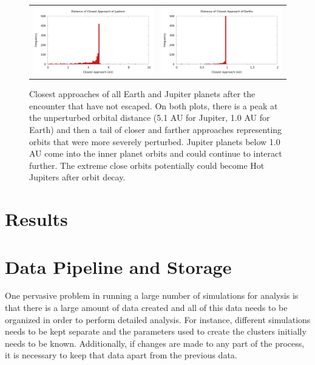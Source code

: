 \documentclass[12pt]{article}
\begin{document}
    \begin{figure}[H]
        \centering
        \caption{Closest approaches of all Earth and Jupiter planets after 
            the encounter that have not escaped. On both plots, there is a peak
            at the unperturbed orbital distance (5.1 AU for Jupiter, 1.0 AU for
            Earth) and then a tail of closer and farther approaches representing
            orbits that were more severely perturbed. Jupiter planets below 1.0 AU
            come into the inner planet orbits and could continue to interact further.
            The extreme close orbits potentially could become Hot Jupiters after
            orbit decay.
        }
        \begin{tabular}{cc}
            \includegraphics[width=3.25in]{jupiter_distance_final} &
            \includegraphics[width=3.25in]{earth_distance_final}
        \end{tabular}
    \end{figure}


\section{Results}



\section{Data Pipeline and Storage}

    One pervasive problem in running a large number of simulations for analysis is
    that there is a large amount of data created and all of this data needs to be
    organized in order to perform detailed analysis. For instance, different simulations
    needs to be kept separate and the parameters used to create the clusters initially
    needs to be known. Additionally, if changes are made to any part of the process, it
    is necessary to keep that data apart from the previous data.
\end{document}
